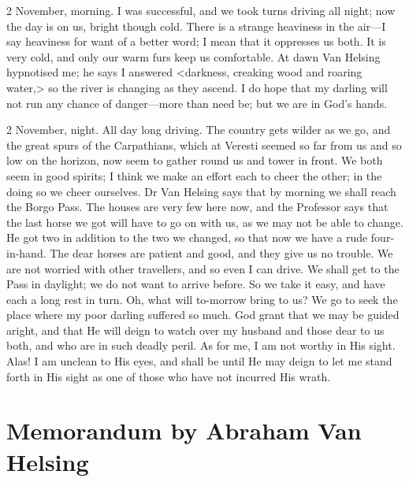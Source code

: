  

\begin{diary}{2 November, morning.}
I was successful, and we took turns driving all night; now the day is on us, bright though cold. There is a strange heaviness in the air—I say heaviness for want of a better word; I mean that it oppresses us both. It is very cold, and only our warm furs keep us comfortable. At dawn Van Helsing hypnotised me; he says I answered <darkness, creaking wood and roaring water,> so the river is changing as they ascend. I do hope that my darling will not run any chance of danger—more than need be; but we are in God's hands.
	\end{diary}

 

\begin{diary}{2 November, night.}
All day long driving. The country gets wilder as we go, and the great spurs of the Carpathians, which at Veresti seemed so far from us and so low on the horizon, now seem to gather round us and tower in front. We both seem in good spirits; I think we make an effort each to cheer the other; in the doing so we cheer ourselves. Dr Van Helsing says that by morning we shall reach the Borgo Pass. The houses are very few here now, and the Professor says that the last horse we got will have to go on with us, as we may not be able to change. He got two in addition to the two we changed, so that now we have a rude four-in-hand. The dear horses are patient and good, and they give us no trouble. We are not worried with other travellers, and so even I can drive. We shall get to the Pass in daylight; we do not want to arrive before. So we take it easy, and have each a long rest in turn. Oh, what will to-morrow bring to us? We go to seek the place where my poor darling suffered so much. God grant that we may be guided aright, and that He will deign to watch over my husband and those dear to us both, and who are in such deadly peril. As for me, I am not worthy in His sight. Alas! I am unclean to His eyes, and shall be until He may deign to let me stand forth in His sight as one of those who have not incurred His wrath.
	\end{diary}

\section{Memorandum by Abraham Van Helsing}

